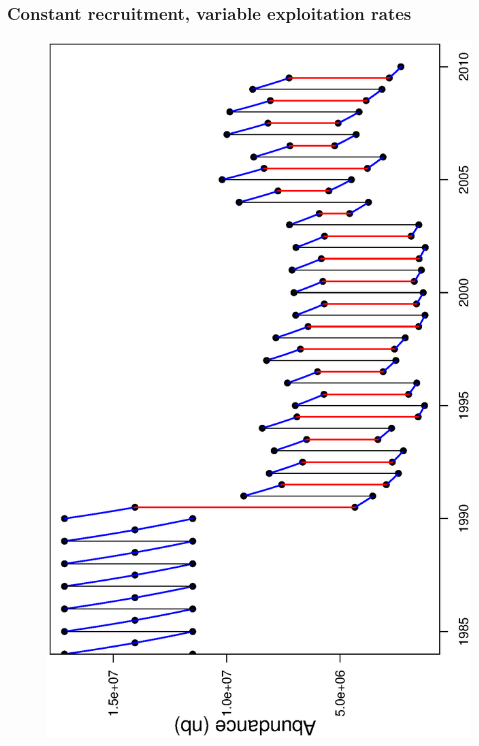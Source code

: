 \documentclass{beamer}
\begin{document}
\begin{frame}
\frametitle{Constant recruitment, variable exploitation rates}

\begin{figure}
  \includegraphics[scale=0.38, angle=-90]{../../TestCASAL2_withSimulatedData/StockDescriptionInNumbers/EstimateSingleConstantRecruitment/ByPassingInitialAbundancesToCASAL2/Results/Graphics/PopDynamics.ps}
  \end{figure}

\end{frame}
\end{document}
